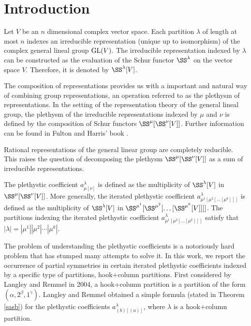 \documentclass[twoside]{article}
\begin{document}
\tableofcontents

\newpage
\section{Introduction}
\newcommand{\GL}{\textnormal{GL}}
\newcommand{\Gl}{\textnormal{GL}}
Let $V$ be an $n$ dimensional complex vector space.
Each partition $\lambda$ of length at most $n$ indexes an 
irreducible representation (unique up to isomorphism)  of the complex general lineal group $\GL(V).$ 
The irreducible representation   indexed by $\lambda$
can be  constructed as the evaluation of the Schur functor $\SS^\lambda$ on the vector space $V.$ Therefore, it is denoted   by $\SS^\lambda[V]$.

The composition of representations provides us with a important and natural way of combining group representations, an operation  referred to as the plethysm of representations. In the
setting of the representation theory of the general lineal group, the plethysm of the irreducible representations indexed by $\mu$  and $\nu$ is  defined by the composition of Schur functors
$ \SS^\mu[ \SS^\nu[V]]$. 
 Further information  can be found in Fulton and Harris' book \cite{Fulton_Harris}.

Rational representations %
of the general linear group are completely reducible. This raises
 the question of decomposing the plethysm $\SS^\mu[ \SS^\nu[V]]$  as a sum of irreducible representations.
 
The plethystic coefficient $a_{\mu[\nu]}^\lambda$ is defined as the multiplicity of $ \SS^\lambda[V]$ in  $ \SS^\mu[ \SS^\nu[V]]$.
More generally, the iterated plethystic coefficient $a_{\mu^1[\mu^2[\ldots[\mu^k]]]}^\lambda$ is defined as the
multiplicity of $ \SS^\lambda[V]$ in  $\SS^{\mu^1}[\SS^{\mu^2}[\ldots[\SS^{\mu^k}[V]]]]$.  The partitions indexing the iterated plethystic coefficient
$a_{\mu^1[\mu^2[\ldots[\mu^k]]]}^\lambda$ satisfy that $|\lambda| = |\mu^1| |\mu^2| \cdots |\mu^k|$. 



The problem of understanding  the plethystic coefficients is a notoriously hard problem \cite{Fulton_Harris, colmenarejo17, fischer, kahle} that has stumped many attempts to solve it.
In this work, we report the occurrence of partial symmetries in certain iterated plethystic coefficients indexed by a specific type of partitions, hook+column partitions. First considered by 
 Langley and Remmel \cite{langley} in 2004, a hook+column
 partition is a partition of the form $(\alpha, 2^\beta, 1^\gamma)$.
Langley and Remmel  obtained  a simple formula (stated in Theorem \ref{sasb}) for the plethystic coefficients
$a^\lambda_{(b)[(a)]}$, where $\lambda$ is a  hook+column partition. 
\end{document}
